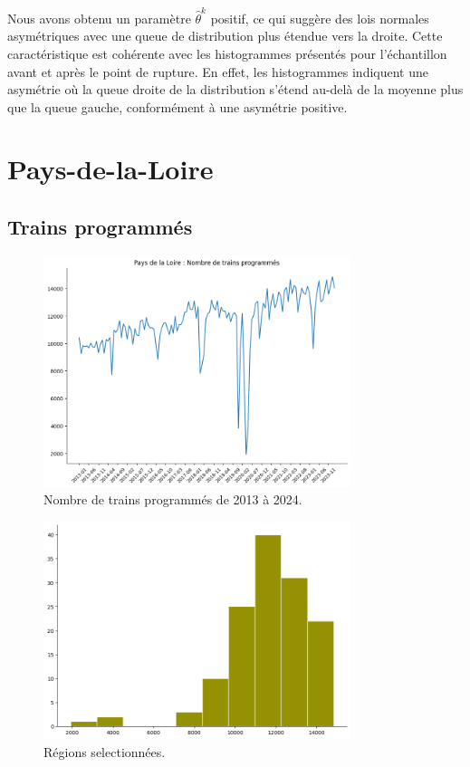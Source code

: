 {Nous avons obtenu un paramètre $\hat{\theta}^k$ positif, ce qui suggère des lois normales asymétriques avec une queue de distribution plus étendue vers la droite. Cette caractéristique est cohérente avec les histogrammes présentés pour l'échantillon avant et après le point de rupture. En effet, les histogrammes indiquent une asymétrie où la queue droite de la distribution s'étend au-delà de la moyenne plus que la queue gauche, conformément à une asymétrie positive.


\section{Pays-de-la-Loire}

\subsection{Trains programmés}

\begin{figure}[H]
\centering
\includegraphics[width=0.8\textwidth]{image/PL-FIG01.png} 
\caption{Nombre de trains programmés de 2013 à 2024.}
\label{fig:trains_programmes}
\end{figure}

\begin{figure}[H]
\centering
\includegraphics[width=0.8\textwidth]{image/PL-FIG02.png} 
\caption{Régions selectionnées.}
\label{fig:trains_programmes_2}
\end{figure}


}
